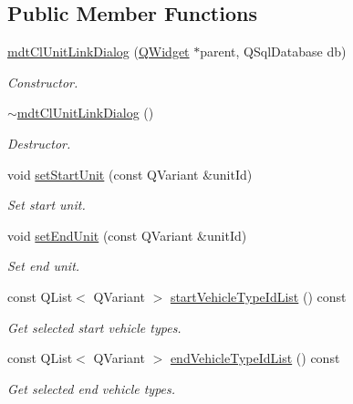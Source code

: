 \subsection*{Public Member Functions}
\begin{DoxyCompactItemize}
\item 
\hyperlink{classmdt_cl_unit_link_dialog_aecb541b458e86006bb5ba8b6d5b6fafb}{mdt\-Cl\-Unit\-Link\-Dialog} (\hyperlink{class_q_widget}{Q\-Widget} $\ast$parent, Q\-Sql\-Database db)
\begin{DoxyCompactList}\small\item\em Constructor. \end{DoxyCompactList}\item 
\hyperlink{classmdt_cl_unit_link_dialog_a0a77f250456330ba367cab406d0312d8}{$\sim$mdt\-Cl\-Unit\-Link\-Dialog} ()
\begin{DoxyCompactList}\small\item\em Destructor. \end{DoxyCompactList}\item 
void \hyperlink{classmdt_cl_unit_link_dialog_afca17028440970a898b9dcd3c1ad6923}{set\-Start\-Unit} (const Q\-Variant \&unit\-Id)
\begin{DoxyCompactList}\small\item\em Set start unit. \end{DoxyCompactList}\item 
void \hyperlink{classmdt_cl_unit_link_dialog_a53c0fc3dd8a4134acd185d91e92f0f83}{set\-End\-Unit} (const Q\-Variant \&unit\-Id)
\begin{DoxyCompactList}\small\item\em Set end unit. \end{DoxyCompactList}\item 
const Q\-List$<$ Q\-Variant $>$ \hyperlink{classmdt_cl_unit_link_dialog_a38fb21e39ed2f2e1d65a68a424895ac4}{start\-Vehicle\-Type\-Id\-List} () const 
\begin{DoxyCompactList}\small\item\em Get selected start vehicle types. \end{DoxyCompactList}\item 
const Q\-List$<$ Q\-Variant $>$ \hyperlink{classmdt_cl_unit_link_dialog_abe96eb187294372b022b2a8ba9c645b6}{end\-Vehicle\-Type\-Id\-List} () const 
\begin{DoxyCompactList}\small\item\em Get selected end vehicle types. \end{DoxyCompactList}\item 

\end{DoxyCompactItemize}
